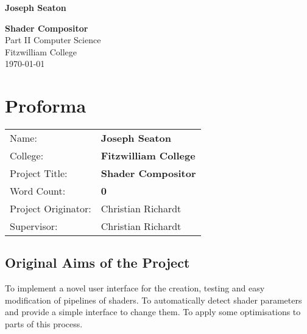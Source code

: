 \documentclass[12pt,twoside,notitlepage]{report}
\begin{document}


\newcommand{\name}{Joseph Seaton}
\newcommand{\college}{Fitzwilliam College}
\newcommand{\ptitle}{Shader Compositor}



\pagestyle{empty}

\hfill{\LARGE \bf \name}

\vspace*{60mm}
\begin{center}
\Huge
{\bf \ptitle} \\
\vspace*{5mm}
Part II Computer Science \\
\vspace*{5mm}
\college \\
\vspace*{5mm}
\today  %
\end{center}

\cleardoublepage


\setcounter{page}{1}
\pagestyle{plain}

\chapter*{Proforma}

{\large
\begin{tabular}{ll}
Name:               & \bf \name    \\
College:            & \bf \college \\
Project Title:      & \bf \ptitle  \\
Word Count:         & \bf 0\\
Project Originator: & Christian Richardt                    \\
Supervisor:         & Christian Richardt                    \\ 
\end{tabular}
}


\section*{Original Aims of the Project}
To implement a novel user interface for the creation, testing and easy modification of pipelines of shaders. To automatically detect shader parameters and provide a simple interface to change them. To apply some optimisations to parts of this process.
\end{document}
